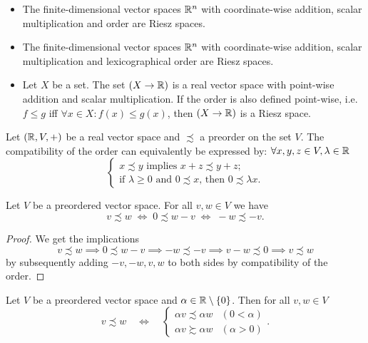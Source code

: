\begin{example}
\begin{itemize}
\item The finite-dimensional vector spaces $\mathbb{R}^n$ with coordinate-wise addition, scalar multiplication and order are Riesz spaces.
\item The finite-dimensional vector spaces $\mathbb{R}^n$ with coordinate-wise addition, scalar multiplication and lexicographical order are Riesz spaces.
\item Let $X$ be a set. The set $(X\to \mathbb{R})$ is a real vector space with point-wise addition and scalar multiplication. If the order is also defined point-wise, i.e.\ $f \leq g$ iff $\forall x\in X: f(x) \leq g(x)$, then $(X\to \mathbb{R})$ is a Riesz space.
\end{itemize}
\end{example}

\begin{lemma} \label{positiveConeOrderCharacterisation}
Let $\sSet{\R, V, +}$ be a real vector space and $\precsim$ a preorder on the set $V$. The compatibility of the order can equivalently be expressed by:
$\forall x,y,z\in V, \lambda\in\mathbb{R}$
\[ \begin{cases}
\text{$x \precsim y$ implies $x+z \precsim y+z$;} \\
\text{if $\lambda\geq 0$ and $0 \precsim x$, then $0 \precsim \lambda x$.}
\end{cases} \]
\end{lemma}

\begin{lemma} \label{elementaryVectorPreorderManipulations}
Let $V$ be a preordered vector space. For all $v,w \in V$ we have
\[ v \precsim w \;\iff\; 0 \precsim  w - v \;\iff\; -w \precsim -v.  \]
\end{lemma}
\begin{proof}
We get the implications
\[ v \precsim w \implies 0 \precsim  w - v \implies -w \precsim -v \implies v-w \precsim 0 \implies v\precsim w \]
by subsequently adding $-v, -w, v,w$ to both sides by compatibility of the order.
\end{proof}
\begin{corollary}
Let $V$ be a preordered vector space and $\alpha \in \mathbb{R}\setminus\{0\}$. Then for all $v,w\in V$
\[ v \precsim w \quad \iff \quad \begin{cases}
\alpha v \precsim \alpha w & (0 < \alpha) \\
\alpha v \succsim \alpha w & (\alpha > 0)
\end{cases}. \] 
\end{corollary}

